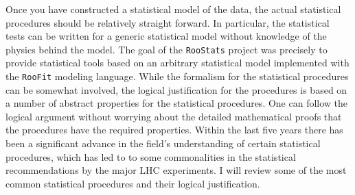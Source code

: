 Once you have constructed a statistical model of the data, the actual statistical procedures should be relatively straight forward.  In particular, the statistical tests can be written for a generic statistical model without knowledge of the physics behind the model.  The goal of the \texttt{RooStats} project was precisely to provide statistical tools based on an arbitrary statistical model implemented with the \texttt{RooFit} modeling language.  While the formalism for the statistical procedures can be somewhat involved, the logical justification for the procedures is based on a number of abstract properties for the statistical procedures. One can follow the logical argument without worrying about the detailed mathematical proofs that the procedures have the required properties.  Within the last five years there has been a significant advance in the field's understanding of certain statistical procedures, which has led to to some commonalities in the statistical recommendations by the major LHC experiments.  I will review some of the most common statistical procedures and their logical justification.
